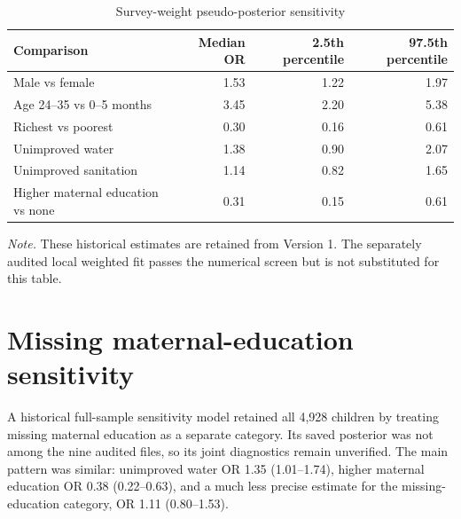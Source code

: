 \documentclass[10pt]{article}
\begin{document}
\begin{table}[H]
\centering
\caption{Survey-weight pseudo-posterior sensitivity}
\small
\begin{tabular}{lrrr}
\toprule
Comparison & Median OR & 2.5th percentile & 97.5th percentile \\
\midrule
Male vs female & 1.53 & 1.22 & 1.97 \\
Age 24--35 vs 0--5 months & 3.45 & 2.20 & 5.38 \\
Richest vs poorest & 0.30 & 0.16 & 0.61 \\
Unimproved water & 1.38 & 0.90 & 2.07 \\
Unimproved sanitation & 1.14 & 0.82 & 1.65 \\
Higher maternal education vs none & 0.31 & 0.15 & 0.61 \\
\bottomrule
\end{tabular}
\begin{minipage}{0.98\textwidth}\footnotesize \textit{Note.} These historical estimates are retained from Version 1. The separately audited local weighted fit passes the numerical screen but is not substituted for this table.\end{minipage}
\end{table}

\section{Missing maternal-education sensitivity}

A historical full-sample sensitivity model retained all 4,928 children by treating missing maternal education as a separate category. Its saved posterior was not among the nine audited files, so its joint diagnostics remain unverified. The main pattern was similar: unimproved water OR 1.35 (1.01--1.74), higher maternal education OR 0.38 (0.22--0.63), and a much less precise estimate for the missing-education category, OR 1.11 (0.80--1.53).
\end{document}
